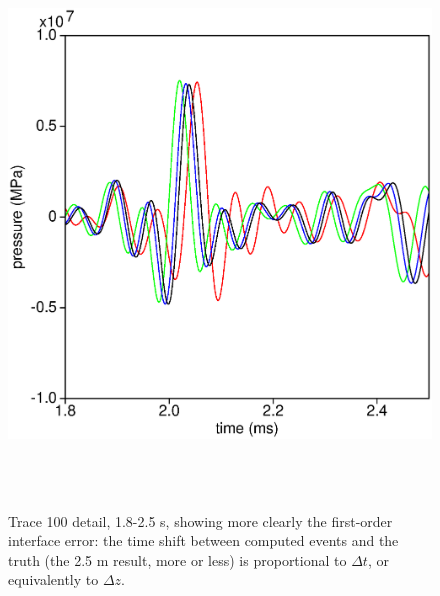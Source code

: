 \documentclass [12pt]{georeport}
\begin{document}
\begin{figure}
\label{fig5}
\includegraphics[height=15cm,width=15cm]{./Fig/fig5.ps}
\caption{Trace 100 detail, 1.8-2.5 s, showing more clearly the
  first-order interface error: the time shift between computed events
  and the truth (the 2.5 m result, more or less) is proportional to
  $\Delta t$, or equivalently to $\Delta z$.}
\end{figure}
\end{document}
